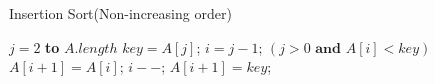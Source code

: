\documentclass[review, authoryear, 3p, 12pt]{elsarticle}
\begin{document}
	\begin{algorithm}[htbp]
		\caption{Insertion Sort(Non-increasing order)}
		\label{alg:tsh}
		\begin{codebox}
			\li 	\For $j=2$ \textbf{to} $A.length$
					\Do
			\li 		$key = A[j]$;
			\li 		$i = j-1$;
			\li 		\While $(j>0 \textbf{ and } A[i] < key)$
						\Do
			\li				$A[i+1]=A[i]$;
			\li 			$i--$; 
						\End
			\li		$A[i+1]=key$;
		\end{codebox}
	\end{algorithm}
\end{document}
